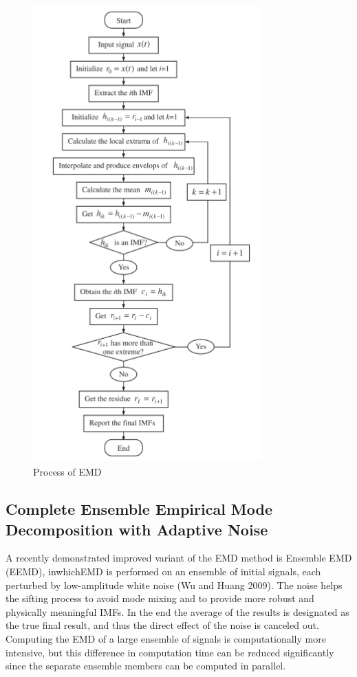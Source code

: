\documentclass[draft]{agujournal2019}
\begin{document}
\begin{figure}[h]
      \centering
      \includegraphics[width=250pt,height=500pt]{img//emd_flowchart.png}
      \caption{Process of EMD}\label{fig:2}
      \end{figure}



\subsection{Complete Ensemble Empirical Mode Decomposition with Adaptive Noise}
A recently demonstrated improved variant of the EMD method is Ensemble EMD (EEMD), inwhichEMD is performed on an ensemble of initial signals, each perturbed by low-amplitude white noise (Wu and Huang 2009). The noise helps the sifting process to avoid mode mixing and to provide more robust and physically meaningful IMFs. In the end the average of the results is designated as the true final result, and thus the direct effect of the noise is canceled out. Computing the EMD of a large ensemble of signals is computationally more intensive, but this difference in computation time can be reduced significantly since the separate ensemble members can be computed in parallel.
\end{document}
